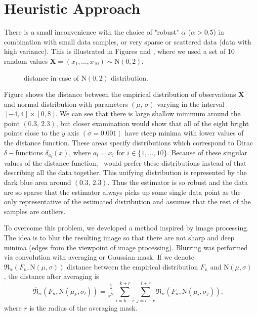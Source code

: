 \section{Heuristic Approach}
There is a small inconvenience with the choice of "robust" $\alpha$ ($\alpha > 0.5$) in combination with small data samples, or very sparse or scattered data (data with high variance). This is illustrated in Figures  and , where we used a set of 10 random values $\mathbf{X} = (x_1, \ldots, x_{10}) \sim \mathrm{N}(0,2)$.

\begin{figure}[htb]
  \centering
  \:%
  \caption{\ren distance in case of $\mathrm{N}(0,2)$ distribution.}
  \end{figure}

Figure  shows the \ren distance between the empirical distribution of observations $\mathbf{X}$ and normal distribution with parameters $(\mu,\, \sigma)$ varying in the interval $[-4,4]\times[0,8].$ We can see that there is large shallow minimum around the point $(0.3, \, 2.3)$, but closer examination would show that all of the eight bright points close to the $y$ axis $(\sigma = 0.001)$ have steep minima with lower values of the \ren distance function. These areas specify distributions which correspond to Dirac $\delta-$functions $\delta_{a_i}(x)$, where $a_i = x_i$ for $i \in \{1,\ldots,10\}$. Because of these singular values of the distance function, \mRao\ would prefer these distributions instead of that describing all the data together. This unifying distribution is represented by the dark blue area around $(0.3, \, 2.3)$. Thus the estimator is so robust and the data are so sparse that the estimator always picks up some single data point as the only representative of the estimated distribution and assumes that the rest of the samples are outliers. 

To overcome this problem, we developed a method inspired by image processing. The idea is to blur the resulting image so that there are not sharp and deep minima (edges from the viewpoint of image processing). Blurring was performed via convolution with averaging or Gaussian mask. If we denote $\mathfrak{R}_\alpha(F_n, \mathrm{N}(\mu,\sigma))$  \ren distance between the empirical distribution $F_n$ and $\mathrm{N}(\mu,\sigma)$, the distance after averaging is 
\begin{equation}
\overline{\mathfrak{R}}_\alpha(F_n, \mathrm{N}(\mu_k,\sigma_l)) = \dfrac{1}{r^2}\sum_{i=k-r}^{k+r} \sum_{j=l-r}^{l+r} \mathfrak{R}_\alpha(F_n, \mathrm{N}(\mu_i,\sigma_j)) ,
\end{equation}
where $r$ is the radius of the averaging mask.


